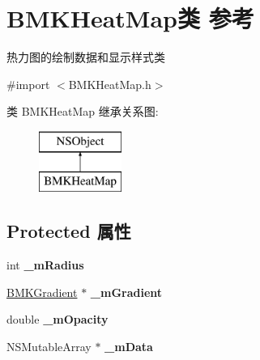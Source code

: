 \hypertarget{interface_b_m_k_heat_map}{\section{B\+M\+K\+Heat\+Map类 参考}
\label{interface_b_m_k_heat_map}
}


热力图的绘制数据和显示样式类  




{\ttfamily \#import $<$B\+M\+K\+Heat\+Map.\+h$>$}

类 B\+M\+K\+Heat\+Map 继承关系图\+:\begin{figure}[H]
\begin{center}
\leavevmode
\includegraphics[height=2.000000cm]{interface_b_m_k_heat_map}
\end{center}
\end{figure}
\subsection*{Protected 属性}
\begin{DoxyCompactItemize}
\item 
\hypertarget{interface_b_m_k_heat_map_a70ff8c509134292bfd1b111196041085}{int {\bfseries \+\_\+m\+Radius}}\label{interface_b_m_k_heat_map_a70ff8c509134292bfd1b111196041085}

\item 
\hypertarget{interface_b_m_k_heat_map_a5cb9c9b8c4e4abad710abca27b2b3ec1}{\hyperlink{interface_b_m_k_gradient}{B\+M\+K\+Gradient} $\ast$ {\bfseries \+\_\+m\+Gradient}}\label{interface_b_m_k_heat_map_a5cb9c9b8c4e4abad710abca27b2b3ec1}

\item 
\hypertarget{interface_b_m_k_heat_map_ab1a2aac49094b1fb6c53ab09f9fc999d}{double {\bfseries \+\_\+m\+Opacity}}\label{interface_b_m_k_heat_map_ab1a2aac49094b1fb6c53ab09f9fc999d}

\item 
\hypertarget{interface_b_m_k_heat_map_a201c72e6cb01fec1eb1af4315b2508ba}{N\+S\+Mutable\+Array $\ast$ {\bfseries \+\_\+m\+Data}}\label{interface_b_m_k_heat_map_a201c72e6cb01fec1eb1af4315b2508ba}

\end{DoxyCompactItemize}
